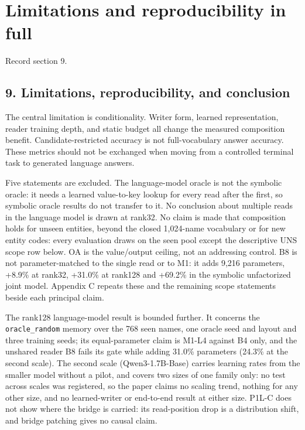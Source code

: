\section{Limitations and reproducibility in full}\label{app:G}
\noindent Record section 9.
\subsection*{9. Limitations, reproducibility, and conclusion}

The central limitation is conditionality. Writer form, learned representation,
reader training depth, and static budget all change the measured composition
benefit. Candidate-restricted  %
accuracy is not full-vocabulary answer accuracy. These metrics should not be exchanged when moving  %
from a controlled terminal task to generated language answers.

Five statements are excluded. The language-model oracle is not the symbolic oracle: it needs
a learned value-to-key lookup for every read after the first, so symbolic oracle results do
not transfer to it. No conclusion about multiple reads in the  %
language model is drawn at rank32. No claim is made that composition holds for  %
unseen entities, beyond the closed 1,024-name vocabulary or for new entity codes: every
evaluation draws on the seen pool except the descriptive UNS scope row below.  %
OA is the
value/\allowbreak{}output ceiling, not an addressing control. B8 is not  %
parameter-matched to the single read or to M1: it adds 9,216 parameters, +8.9\% at rank32,
+31.0\% at rank128 and +69.2\% in the symbolic unfactorized joint model.  %
Appendix C repeats these and the remaining scope statements
beside each principal claim.

The rank128 language-model result is bounded further. It concerns the \texttt{oracle\_random} memory over the 768 seen names, one
oracle seed and layout and three training seeds; its equal-parameter claim is M1-L4 against B4 only, and the unshared reader B8
fails its gate while adding 31.0\% parameters (24.3\% at the second scale). The second scale (Qwen3-1.7B-Base)  %
carries learning rates from the smaller model without a pilot, and covers two sizes of one family only: no test across scales was
registered, so the paper claims no scaling trend, nothing for any other size, and no learned-writer or end-to-end result at either size.
 P1L-C does not show where the bridge is carried: its  %
read-position drop is a distribution shift, and bridge patching gives no causal claim.  %

